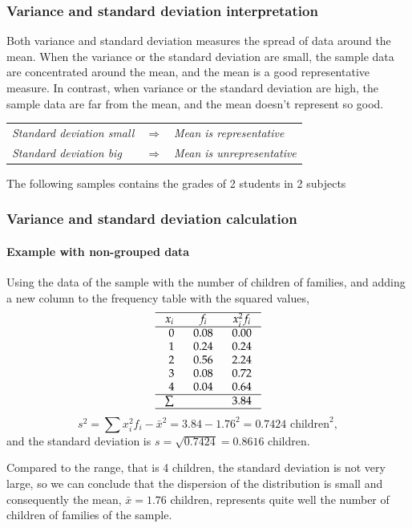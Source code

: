 \begin{frame}
\frametitle{Variance and standard deviation interpretation}
Both variance and standard deviation measures the spread of data around the mean. 
When the variance or the standard deviation are small, the sample data are concentrated around the mean, and the mean is
a good representative measure. 
In contrast, when variance or the standard deviation are high, the sample data are far from the mean, and the mean
doesn't represent so good. 
\begin{center}
\begin{tabular}{lcl}
\emph{Standard deviation small} & $\Rightarrow$ & \emph{Mean is representative}\\
\emph{Standard deviation big} & $\Rightarrow$ & \emph{Mean is unrepresentative}\\
\end{tabular}
\end{center}

 The following samples contains the grades of 2 students in 2 subjects 
\begin{center}
\scalebox{1}{}

\end{center}
\end{frame}


\begin{frame}
\frametitle{Variance and standard deviation calculation}
\framesubtitle{Example with non-grouped data}
Using the data of the sample with the number of children of families, and adding a new column to the frequency table
with the squared values, 
\[
\setlength\arraycolsep{3mm}
\setlength\arrayrulewidth{0.5pt}
\begin{array}{rrr}
\hline
\multicolumn{1}{c}{x_i} & \multicolumn{1}{c}{f_i} & \multicolumn{1}{c}{x_i^2f_i} \\
\hline
0 & 0.08 & 0.00 \\
1 & 0.24 & 0.24 \\
2 & 0.56 & 2.24\\
3 & 0.08  & 0.72\\
4 & 0.04 & 0.64 \\
\hline
\sum &  &  3.84\\ 
\hline
\end{array}
\]
\[
s^2 = \sum x_i^2f_i-\bar x^2 = 3.84-1.76^2= 0.7424 \mbox{ children}^2,
\]
and the standard deviation is $s=\sqrt{0.7424} = 0.8616$ children.

Compared to the range, that is 4 children, the standard deviation is not very large, so we can conclude
that the dispersion of the distribution is small and consequently the mean, $\bar x=1.76$ children, represents quite
well the number of children of families of the sample. 
\end{frame}



